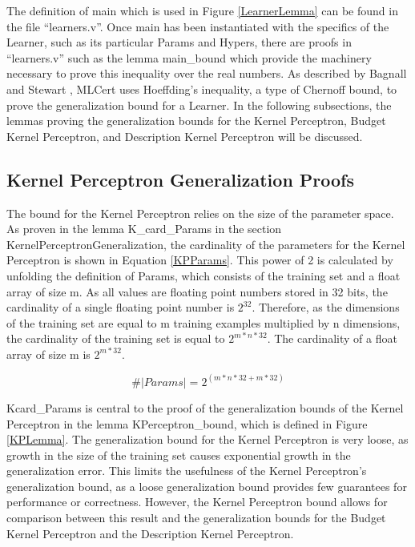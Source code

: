 The definition of main which is used in Figure \ref{LearnerLemma} can be found in the file ``learners.v''. Once main has been instantiated with the specifics of the Learner, such as its particular Params and Hypers, there are proofs in ``learners.v'' such as the lemma main\_bound which provide the machinery necessary to prove this inequality over the real numbers. As described by Bagnall and Stewart \cite{BS19}, MLCert uses Hoeffding's inequality, a type of Chernoff bound, to prove the generalization bound for a Learner. In the following subsections, the lemmas proving the generalization bounds for the Kernel Perceptron, Budget Kernel Perceptron, and Description Kernel Perceptron will be discussed.
\subsection{Kernel Perceptron Generalization Proofs}\label{KPProofs}
The bound for the Kernel Perceptron relies on the size of the parameter space. As proven in the lemma K\_card\_Params in the section KernelPerceptronGeneralization, the cardinality of the parameters for the Kernel Perceptron is shown in Equation \ref{KPParams}. This power of 2 is calculated by unfolding the definition of Params, which consists of the training set and a float array of size m. As all values are floating point numbers stored in 32 bits, the cardinality of a single floating point number is $2^{32}$. Therefore, as the dimensions of the training set are equal to m training examples multiplied by n dimensions, the cardinality of the training set is equal to $2^{m*n*32}$. The cardinality of a float array of size m is $2^{m * 32}$. 

\begin{equation} \label{KPParams}
 \#|Params| = 2^{(m*n*32 + m*32)}
\end{equation}

Kcard\_Params is central to the proof of the generalization bounds of the Kernel Perceptron in the lemma KPerceptron\_bound, which is defined in Figure \ref{KPLemma}. The generalization bound for the Kernel Perceptron is very loose, as growth in the size of the training set causes exponential growth in the generalization error. This limits the usefulness of the Kernel Perceptron's generalization bound, as a loose generalization bound provides few guarantees for performance or correctness. However, the Kernel Perceptron bound allows for comparison between this result and the generalization bounds for the Budget Kernel Perceptron and the Description Kernel Perceptron. 


